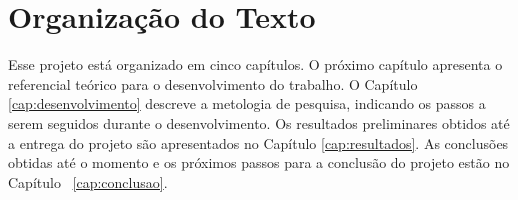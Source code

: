 \section{Organização do Texto}

Esse projeto está organizado em cinco capítulos. O próximo capítulo apresenta o referencial teórico para o desenvolvimento do trabalho. %
O Capítulo \ref{cap:desenvolvimento} descreve a metologia de pesquisa, indicando os passos a serem seguidos durante o desenvolvimento. Os resultados preliminares obtidos até a entrega do projeto são apresentados no Capítulo \ref{cap:resultados}. As conclusões obtidas até o momento e os próximos passos para a conclusão do projeto estão no Capítulo ~\ref{cap:conclusao}.





